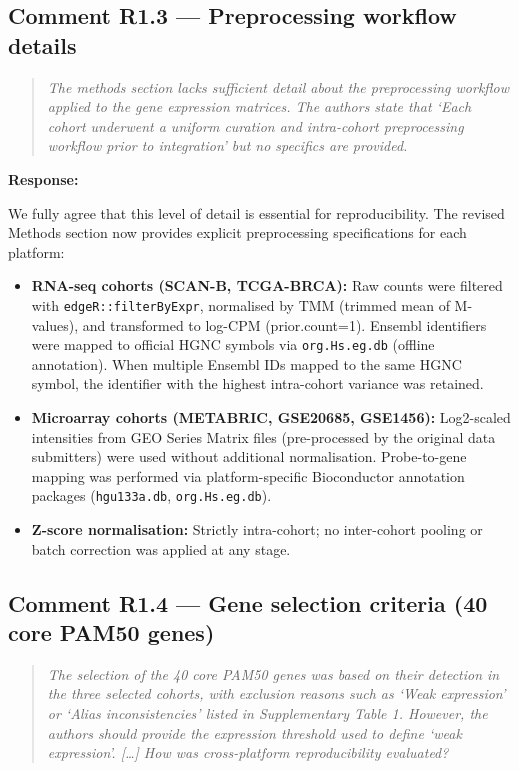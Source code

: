 \documentclass[11pt]{article}
\newcommand{\reviewerquote}[1]{\begin{quote}\itshape #1\end{quote}}
\begin{document}
\subsection*{Comment R1.3 --- Preprocessing workflow details}

\reviewerquote{The methods section lacks sufficient detail about the preprocessing workflow applied to the gene expression matrices. The authors state that `Each cohort underwent a uniform curation and intra-cohort preprocessing workflow prior to integration' but no specifics are provided.}

\noindent\textbf{Response:}

We fully agree that this level of detail is essential for reproducibility. The revised Methods section now provides explicit preprocessing specifications for each platform:

\begin{itemize}
  \item \textbf{RNA-seq cohorts (SCAN-B, TCGA-BRCA):} Raw counts were filtered with \texttt{edgeR::filterByExpr}, normalised by TMM (trimmed mean of M-values), and transformed to log-CPM (prior.count=1). Ensembl identifiers were mapped to official HGNC symbols via \texttt{org.Hs.eg.db} (offline annotation). When multiple Ensembl IDs mapped to the same HGNC symbol, the identifier with the highest intra-cohort variance was retained.
  \item \textbf{Microarray cohorts (METABRIC, GSE20685, GSE1456):} Log2-scaled intensities from GEO Series Matrix files (pre-processed by the original data submitters) were used without additional normalisation. Probe-to-gene mapping was performed via platform-specific Bioconductor annotation packages (\texttt{hgu133a.db}, \texttt{org.Hs.eg.db}).
  \item \textbf{Z-score normalisation:} Strictly intra-cohort; no inter-cohort pooling or batch correction was applied at any stage.
\end{itemize}

\subsection*{Comment R1.4 --- Gene selection criteria (40 core PAM50 genes)}

\reviewerquote{The selection of the 40 core PAM50 genes was based on their detection in the three selected cohorts, with exclusion reasons such as `Weak expression' or `Alias inconsistencies' listed in Supplementary Table 1. However, the authors should provide the expression threshold used to define `weak expression'. [\ldots] How was cross-platform reproducibility evaluated?}
\end{document}
